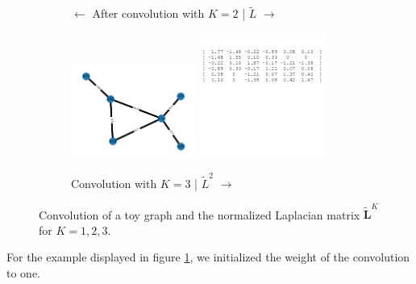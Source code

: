 \begin{figure}
\begin{subfigure}{0.45\textwidth}
        \caption{$\leftarrow$ After convolution with $K=2$ | $\tilde{L}$ $\rightarrow$}
    \end{subfigure}
    \hfill
    \begin{subfigure}{0.45\textwidth}
        \centering
        \includegraphics[width=0.45\textwidth]{figures/toy_graph_conv_K3.png}
        \includegraphics[width=0.45\textwidth]{figures/lap2.png}
        \caption{Convolution with $K=3$ | $\tilde{L}^2$ $\rightarrow$ }
    \end{subfigure}
    \caption{Convolution of a toy graph and the normalized Laplacian matrix $\widetilde{\mathbf{L}}^K$ for $K=1, 2, 3$.}
    \label{fig:toyGraph}
 \end{figure}
For the example displayed in figure \ref{fig:toyGraph}, we initialized the weight of the convolution to one.

